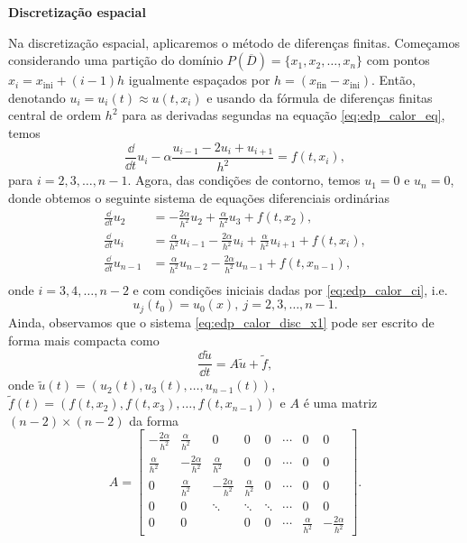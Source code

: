 \begin{flushleft}
  {\bf Discretização espacial}
\end{flushleft}

Na discretização espacial, aplicaremos o método de diferenças finitas. Começamos considerando uma partição do domínio $P(\overline{D}) = \{x_1, x_2, \dotsc, x_n\}$ com pontos $x_i = x_{\text{ini}}+(i-1)h$ igualmente espaçados por $h=(x_{\text{fin}}-x_{\text{ini}})$.  Então, denotando $u_{i}=u_{i}(t)\approx u(t,x_i)$ e usando da fórmula de diferenças finitas central de ordem $h^2$ para as derivadas segundas na equação \eqref{eq:edp_calor_eq}, temos
\begin{equation}
  \frac{\dd}{\dd t}u_{i} - \alpha\frac{u_{i-1}-2u_{i}+u_{i+1}}{h^2} = f(t,x_i),
\end{equation}
para $i=2, 3, \dotsc, n-1$. Agora, das condições de contorno, temos $u_1=0$ e $u_n=0$, donde obtemos o seguinte sistema de equações diferenciais ordinárias
\begin{align}\label{eq:edp_calor_disc_x1}
  \frac{\dd}{\dd t}u_2 &= -\frac{2\alpha}{h^2}u_{2} +\frac{\alpha}{h^2}u_{3} + f(t,x_2),\\
  \frac{\dd}{\dd t}u_i &= \frac{\alpha}{h^2}u_{i-1} - \frac{2\alpha}{h^2}u_{i} +\frac{\alpha}{h^2}u_{i+1} + f(t,x_i),\\
  \frac{\dd}{\dd t}u_{n-1} &= \frac{\alpha}{h^2}u_{n-2} - \frac{2\alpha}{h^2}u_{n-1}  + f(t,x_{n-1}),\\
\end{align}
onde $i=3, 4, \dotsc, n-2$ e com condições iniciais dadas por \eqref{eq:edp_calor_ci}, i.e.
\begin{equation}\label{eq:edp_calor_disc_x2}
  u_j(t_0) = u_0(x),~j=2, 3, \dotsc, n-1.
\end{equation}
Ainda, observamos que o sistema \eqref{eq:edp_calor_disc_x1} pode ser escrito de forma mais compacta como
\begin{equation}
  \frac{\dd \tilde{u}}{\dd t} = A\tilde{u} + \tilde{f},
\end{equation}
onde $\tilde{u}(t) = (u_2(t), u_3(t), \dotsc, u_{n-1}(t))$, $\tilde{f}(t) = (f(t,x_2), f(t,x_3), \dotsc, f(t,x_{n-1}))$ e $A$ é uma matriz $(n-2)\times (n-2)$ da forma
\begin{equation}\label{eq:edp_calor_disc_x3}
  A =
  \begin{bmatrix}
    -\frac{2\alpha}{h^2} & \frac{\alpha}{h^2} & 0 & 0 & 0 & \cdots & 0 & 0\\
    \frac{\alpha}{h^2} & -\frac{2\alpha}{h^2} & \frac{\alpha}{h^2} & 0 & 0 & \cdots & 0 & 0\\
    0 & \frac{\alpha}{h^2} & -\frac{2\alpha}{h^2} & \frac{\alpha}{h^2} & 0 & \cdots & 0 & 0\\
    0 & 0 & \ddots & \ddots & \ddots & \cdots & 0 & 0\\
    0 & 0 & & 0 & 0 & \cdots & \frac{\alpha}{h^2} & -\frac{2\alpha}{h^2}
  \end{bmatrix}.
\end{equation}


